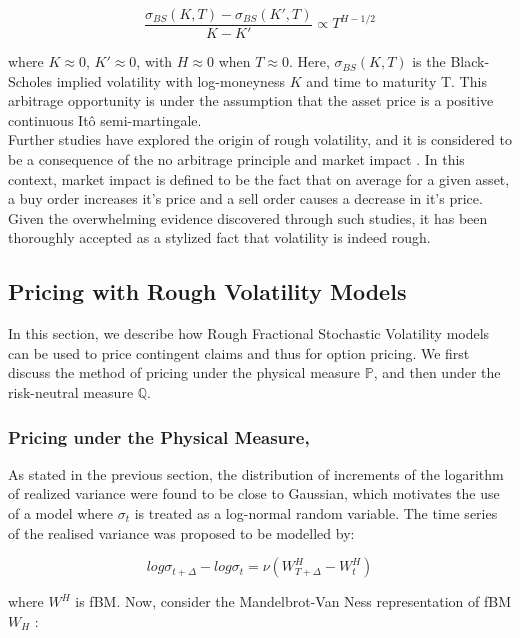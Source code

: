 \documentclass[12pt,oneside]{article}
\begin{document}
\begin{equation}
\label{eqn:powerlaw}
\frac{\sigma_{BS}(K,T) - \sigma_{BS}(K',T)}{K-K'}\propto T^{H-1/2}
\end{equation}

where $K \approx 0$, $K' \approx 0$, with $H \approx 0$ when $T \approx 0$. Here, $\sigma_{BS}(K,T)$ is the Black-Scholes implied volatility with log-moneyness $K$ and time to maturity T. This arbitrage opportunity is under the assumption that the asset price is a positive continuous It\^o semi-martingale.
\\

Further studies have explored the origin of rough volatility, and it is considered to be a consequence of the no arbitrage principle and market impact \cite{Jusselin2018}. In this context, market impact is defined to be the fact that on average for a given asset, a buy order increases it's price and a sell order causes a decrease in it's price. Given the overwhelming evidence discovered through such studies, it has been thoroughly accepted as a stylized fact that volatility is indeed rough.

\subsection{Pricing with Rough Volatility Models}
\label{sec:Pricing}
In this section, we describe how Rough Fractional Stochastic Volatility models can be used to price contingent claims and thus for option pricing. We first discuss the method of pricing under the physical measure $\mathbb{P}$, and then under the risk-neutral measure $\mathbb{Q}$. 

\subsubsection{Pricing under the Physical Measure, }

As stated in the previous section, the distribution of increments of the logarithm of realized variance were found to be close to Gaussian, which motivates the use of a model where $\sigma_{t}$ is treated as a log-normal random variable. The time series of the realised variance was proposed to be modelled by:

\begin{equation}
\label{eq:realizedvariance}
    log\sigma_{t+\Delta} - log\sigma_{t} = \nu (W_{T+\Delta}^{H} - W_{t}^{H})
\end{equation}

where $W^{H}$ is fBM.
Now, consider the Mandelbrot-Van Ness representation of fBM $W_{H}$ \cite{Mandelbrot1968}:
\end{document}
